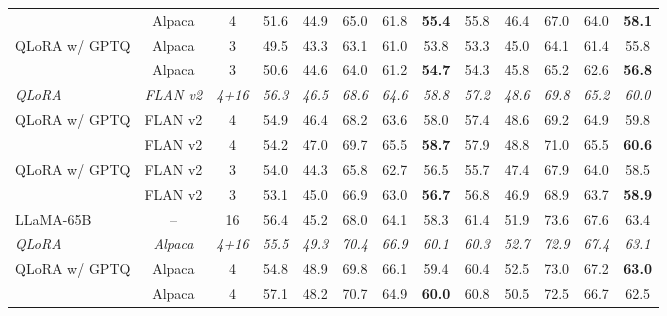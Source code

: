 \begin{table*}[!t]
{{\begin{tabular}{lcc:ccccc:ccccc}
  \ours{}      & Alpaca & 4  & 51.6 & 44.9 & 65.0 & 61.8 & \textbf{55.4} & 55.8 & 46.4 & 67.0 & 64.0 & \textbf{58.1} \\
  QLoRA w/ GPTQ & Alpaca & 3  & 49.5 & 43.3 & 63.1 & 61.0 & 53.8 & 53.3 & 45.0 & 64.1 & 61.4 & 55.8 \\
  \ours{}      & Alpaca & 3  & 50.6 & 44.6 & 64.0 & 61.2 & \textbf{54.7} & 54.3 & 45.8 & 65.2 & 62.6 & \textbf{56.8} \\
\noalign{\vspace{0.1em}}\hdashline[0.8pt/1pt]\noalign{\vspace{0.1em}}
  \textit{QLoRA} & \textit{FLAN v2} & \textit{4+16} & \textit{56.3} & \textit{46.5} & \textit{68.6} & \textit{64.6} & \textit{58.8} & \textit{57.2} & \textit{48.6} & \textit{69.8} & \textit{65.2} & \textit{60.0} \\
\noalign{\vspace{0.1em}}\hdashline[0.8pt/1pt]\noalign{\vspace{0.1em}}
  QLoRA w/ GPTQ & FLAN v2 & 4  & 54.9 & 46.4 & 68.2 & 63.6 & 58.0 & 57.4 & 48.6 & 69.2 & 64.9 & 59.8 \\
  \ours{}      & FLAN v2 & 4  & 54.2 & 47.0 & 69.7 & 65.5 & \textbf{58.7} & 57.9 & 48.8 & 71.0 & 65.5 & \textbf{60.6} \\
  QLoRA w/ GPTQ & FLAN v2 & 3  & 54.0 & 44.3 & 65.8 & 62.7 & 56.5 & 55.7 & 47.4 & 67.9 & 64.0 & 58.5 \\
  \ours{}      & FLAN v2 & 3  & 53.1 & 45.0 & 66.9 & 63.0 & \textbf{56.7} & 56.8 & 46.9 & 68.9 & 63.7 & \textbf{58.9} \\
\midrule
  LLaMA-65B & -- & 16 & 56.4 & 45.2 & 68.0 & 64.1 & 58.3 & 61.4 & 51.9 & 73.6 & 67.6 & 63.4 \\
\noalign{\vspace{0.1em}}\hdashline[0.8pt/1pt]\noalign{\vspace{0.1em}}
  \textit{QLoRA} & \textit{Alpaca} & \textit{4+16} & \textit{55.5} & \textit{49.3} & \textit{70.4} & \textit{66.9} & \textit{60.1} & \textit{60.3} & \textit{52.7} & \textit{72.9} & \textit{67.4} & \textit{63.1} \\
\noalign{\vspace{0.1em}}\hdashline[0.8pt/1pt]\noalign{\vspace{0.1em}}
  QLoRA w/ GPTQ & Alpaca & 4  & 54.8 & 48.9 & 69.8 & 66.1 & 59.4 & 60.4 & 52.5 & 73.0 & 67.2 & \textbf{63.0} \\
  \ours{}      & Alpaca & 4  & 57.1 & 48.2 & 70.7 & 64.9 & \textbf{60.0} & 60.8 & 50.5 & 72.5 & 66.7 & 62.5 \\

\end{tabular}}}
\end{table*}
